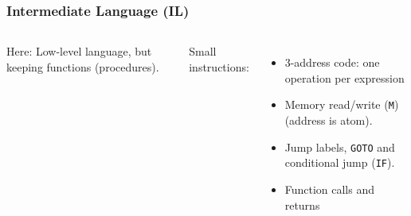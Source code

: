 \documentclass{beamer}
\newcommand{\codesize}{\footnotesize}
\newcommand{\cd}[1]{{{\codesize\tt #1}}}
\renewcommand{\emph}[1]{\textcolor{structure}{#1}}
\newcommand{\emp}[1]{\textcolor{DikuRed}{ #1}}
\begin{document}
\begin{frame}
	\frametitle{Intermediate Language (\textsc{IL})}

\begin{columns}


\emp{Here:} 
	Low-level language, but keeping functions (procedures).
	
	Small instructions:
\begin{itemize}
\item \emph{3-address code}: one operation per expression
\pause
\item \emph{Memory} read/write (\cd{M}) (address is atom).
\pause
\item \emph{Jump} labels, \cd{GOTO} and 
	conditional jump (\cd{IF}).
\pause
\item \emph{Function} calls and returns
\end{itemize}




{\footnotesize
\vspace*{-3ex}

}
\end{columns}
\end{frame}
\end{document}
